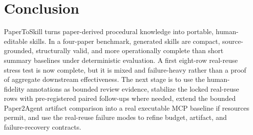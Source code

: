 \section{Conclusion}

PaperToSkill turns paper-derived procedural knowledge into portable,
human-editable skills. In a four-paper benchmark, generated skills are compact,
source-grounded, structurally valid, and more operationally complete than short
summary baselines under deterministic evaluation. A first eight-row real-reuse
stress test is now complete, but it is mixed and failure-heavy rather than a
proof of aggregate downstream effectiveness. The next stage is to use the
human-fidelity annotations as bounded review evidence, stabilize the locked
real-reuse rows with pre-registered paired follow-ups where needed, extend the bounded Paper2Agent artifact
comparison into a real executable MCP baseline if resources permit, and use
the real-reuse failure modes to refine budget, artifact, and failure-recovery
contracts.
